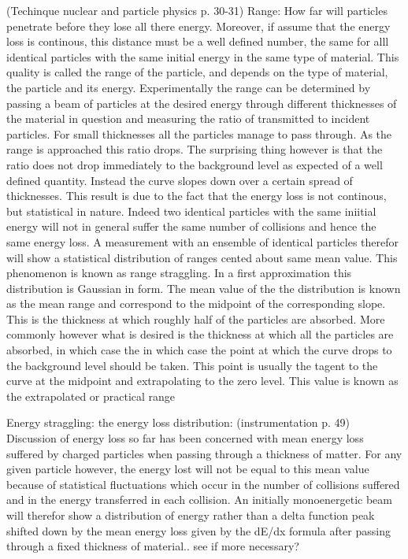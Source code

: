 \documentclass[a4paper,11pt,twoside]{book}
\begin{document}
(Techinque nuclear and particle physics p. 30-31)
Range: How far will particles penetrate before they lose all there energy. Moreover, if assume that the energy loss is continous, this distance must be a well defined number, the same for alll identical particles with the same initial energy in the same type of material. This quality is called the range of the particle, and depends on the type of material, the particle and its energy. Experimentally the range can be determined by passing a beam of particles at the desired energy through different thicknesses of the material in question and measuring the ratio of transmitted to incident particles. For small thicknesses all the particles manage to pass through. As the range is approached this ratio drops. The surprising thing however is that the ratio does not drop immediately to the background level as expected of a well defined quantity. Instead the curve slopes down over a certain spread of thicknesses. This result is due to the fact that the energy loss is not continous, but statistical in nature. Indeed two identical particles with the same iniitial energy will not in general suffer the same number of collisions and hence the same energy loss. A measurement with an ensemble of identical particles therefor will show a statistical distribution of ranges cented about same mean value. This phenomenon is known as range straggling. In a first approximation this distribution is Gaussian in form. The mean value of the the distribution is known as the mean range and correspond to the midpoint of the corresponding slope. This is the thickness at which roughly half of the particles are absorbed. More commonly however what is desired is the thickness at which all the particles are absorbed, in  which case the in which case the point at which the curve drops to the background level should be taken.  This point is usually the tagent to the curve at the midpoint and extrapolating to the zero level. This value is known as the extrapolated or practical range


Energy straggling: the energy loss distribution: (instrumentation p. 49)
Discussion of energy loss so far has been concerned with mean energy loss suffered by charged particles when passing through a thickness of matter. For any given particle however, the energy lost will not be equal to this mean value because of statistical fluctuations which occur in the number of collisions suffered and in the energy transferred in each collision. An initially monoenergetic beam will therefor show a distribution of energy rather than a delta function peak shifted down by the mean energy loss given by the dE/dx formula after passing through a fixed thickness of material.. see if more necessary?
\end{document}

